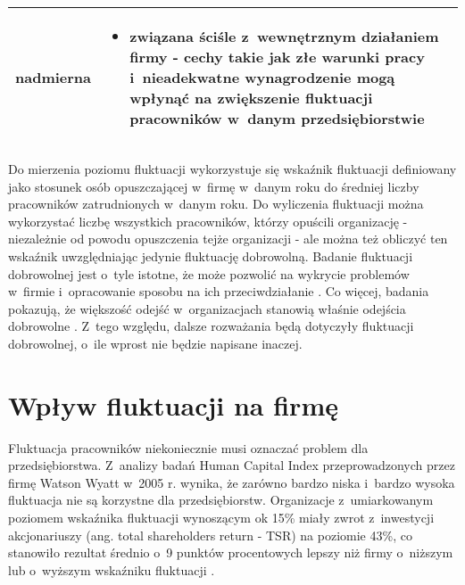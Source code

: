 \begin{minipage}{\textwidth}
\begin{table}[H]
\begin{center}
\begin{tabular}{|P{.15\textwidth}|P{.75\textwidth}|}
                         nadmierna &
                         \begin{itemize}
                             \item związana ściśle z~wewnętrznym działaniem firmy - cechy takie jak złe warunki pracy i~nieadekwatne wynagrodzenie mogą wpłynąć na zwiększenie fluktuacji pracowników w~danym przedsiębiorstwie
                         \end{itemize} \\
                         \hline
                     \end{tabular}
                 \end{center}
                 \raggedright{}
                 \vspace{0.75cm}
             \end{table}
\end{minipage}

Do mierzenia poziomu fluktuacji wykorzystuje się wskaźnik fluktuacji definiowany jako stosunek osób opuszczającej w~firmę w~danym roku do średniej liczby pracowników zatrudnionych w~danym roku.
Do wyliczenia fluktuacji można wykorzystać liczbę wszystkich pracowników, którzy opuścili organizację - niezależnie od powodu opuszczenia tejże organizacji - ale można też obliczyć ten wskaźnik uwzględniając jedynie fluktuację dobrowolną.
Badanie fluktuacji dobrowolnej jest o~tyle istotne, że może pozwolić na wykrycie problemów w~firmie i~opracowanie sposobu na ich przeciwdziałanie \cite{spychala-2019}.
Co więcej, badania pokazują, że większość odejść w~organizacjach stanowią właśnie odejścia dobrowolne \cite{dalton-1982}.
Z~tego względu, dalsze rozważania będą dotyczyły fluktuacji dobrowolnej, o~ile wprost nie będzie napisane inaczej.


\section{Wpływ fluktuacji na firmę}\label{sec:wplyw-fluktuacji-na-firme}
Fluktuacja pracowników niekoniecznie musi oznaczać problem dla przedsiębiorstwa.
Z~analizy badań Human Capital Index przeprowadzonych przez firmę Watson Wyatt w~2005 r. wynika,
że zarówno bardzo niska i~bardzo wysoka fluktuacja nie są korzystne dla przedsiębiorstw.
Organizacje z~umiarkowanym poziomem wskaźnika fluktuacji wynoszącym ok 15\%
miały zwrot z~inwestycji akcjonariuszy (ang. total shareholders return - TSR) na poziomie 43\%,
co stanowiło rezultat średnio o~9 punktów procentowych lepszy niż firmy o~niższym lub o~wyższym wskaźniku fluktuacji \cite{krol-ludwiczynski-2006}.

